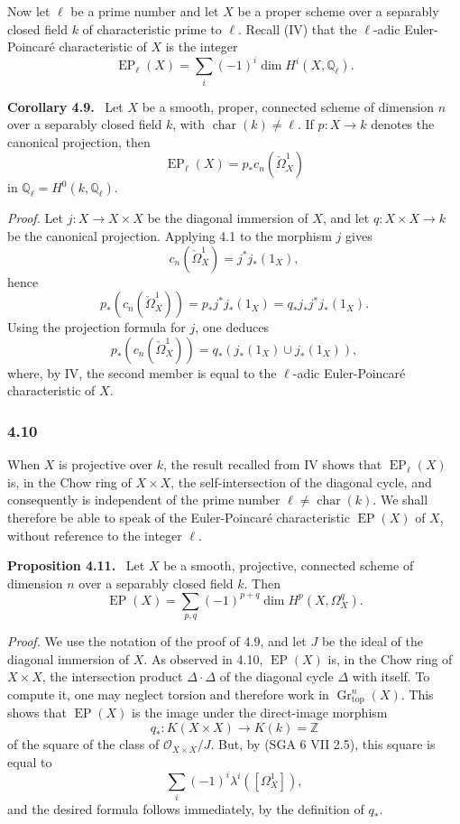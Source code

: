 \documentclass[11pt]{article}
\newenvironment{statement}[1]{\par\medskip\noindent\textbf{#1.}\ }{\par\medskip}
\begin{document}
Now let $\ell$ be a prime number and let $X$ be a proper scheme over a separably closed field $k$ of characteristic prime to $\ell$. Recall (IV) that the $\ell$-adic Euler-Poincaré characteristic of $X$ is the integer
\[
\operatorname{EP}_\ell(X)=\sum_i(-1)^i\dim H^i(X,\mathbb Q_\ell).
\]

\begin{statement}{Corollary 4.9}
Let $X$ be a smooth, proper, connected scheme of dimension $n$ over a separably closed field $k$, with $\operatorname{char}(k)\ne\ell$. If $p:X\to k$ denotes the canonical projection, then
\[
\operatorname{EP}_\ell(X)=p_*c_n(\check\Omega^1_X)
\]
in $\mathbb Q_\ell=H^0(k,\mathbb Q_\ell)$.
\end{statement}

\emph{Proof.} Let $j:X\to X\times X$ be the diagonal immersion of $X$, and let $q:X\times X\to k$ be the canonical projection. Applying 4.1 to the morphism $j$ gives
\[
c_n(\check\Omega^1_X)=j^*j_*(1_X),
\]
hence
\[
p_*(c_n(\check\Omega^1_X))=p_*j^*j_*(1_X)=q_*j_*j^*j_*(1_X).
\]
Using the projection formula for $j$, one deduces
\[
p_*(c_n(\check\Omega^1_X))=q_*(j_*(1_X)\cup j_*(1_X)),
\]
where, by IV, the second member is equal to the $\ell$-adic Euler-Poincaré characteristic of $X$.

\subsubsection*{4.10}
When $X$ is projective over $k$, the result recalled from IV shows that $\operatorname{EP}_\ell(X)$ is, in the Chow ring of $X\times X$, the self-intersection of the diagonal cycle, and consequently is independent of the prime number $\ell\ne\operatorname{char}(k)$. We shall therefore be able to speak of the Euler-Poincaré characteristic $\operatorname{EP}(X)$ of $X$, without reference to the integer $\ell$.

\begin{statement}{Proposition 4.11}
Let $X$ be a smooth, projective, connected scheme of dimension $n$ over a separably closed field $k$. Then
\[
\operatorname{EP}(X)=\sum_{p,q}(-1)^{p+q}\dim H^p(X,\Omega_X^q).
\]
\end{statement}

\emph{Proof.} We use the notation of the proof of 4.9, and let $J$ be the ideal of the diagonal immersion of $X$. As observed in 4.10, $\operatorname{EP}(X)$ is, in the Chow ring of $X\times X$, the intersection product $\Delta\cdot\Delta$ of the diagonal cycle $\Delta$ with itself. To compute it, one may neglect torsion and therefore work in $\operatorname{Gr}_{\mathrm{top}}^n(X)$. This shows that $\operatorname{EP}(X)$ is the image under the direct-image morphism
\[
q_*:K(X\times X)\to K(k)=\mathbb Z
\]
of the square of the class of $\mathcal O_{X\times X}/J$. But, by (SGA 6 VII 2.5), this square is equal to
\[
\sum_i(-1)^i\lambda^i([\Omega_X^1]),
\]
and the desired formula follows immediately, by the definition of $q_*$.
\end{document}
